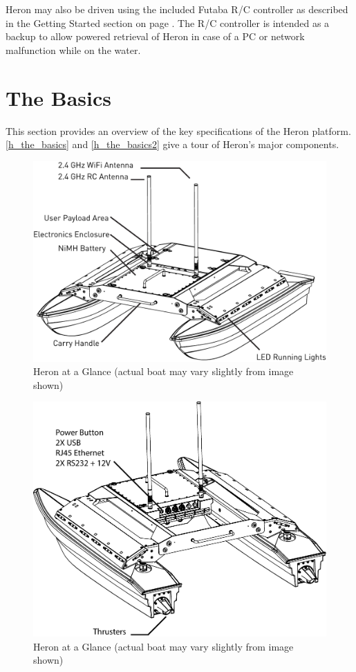 \documentclass[]{clearpath-latex/clearpath-manual}
\begin{document}
Heron may also be driven using the included Futaba R/C controller as described in the Getting Started section on page \pageref{gettingstarted}. The R/C controller is intended as a backup to allow powered retrieval of Heron in case of a PC or network malfunction while on the water. 

\section{The Basics}
This section provides an overview of the key specifications of the Heron platform. \autoref{h_the_basics} and \autoref{h_the_basics2} give a tour of Heron's major components.

\begin{figure}[h]
  \centering  \includegraphics[width=0.75\linewidth]{h-schematic.pdf}
  \caption{Heron at a Glance (actual boat may vary slightly from image shown)}
  \label{h_the_basics}
\end{figure}

\begin{figure}[h]
  \centering  \includegraphics[width=0.75\linewidth]{h-breakouts.pdf}
  \caption{Heron at a Glance (actual boat may vary slightly from image shown)}
  \label{h_the_basics2}
\end{figure}
\end{document}
